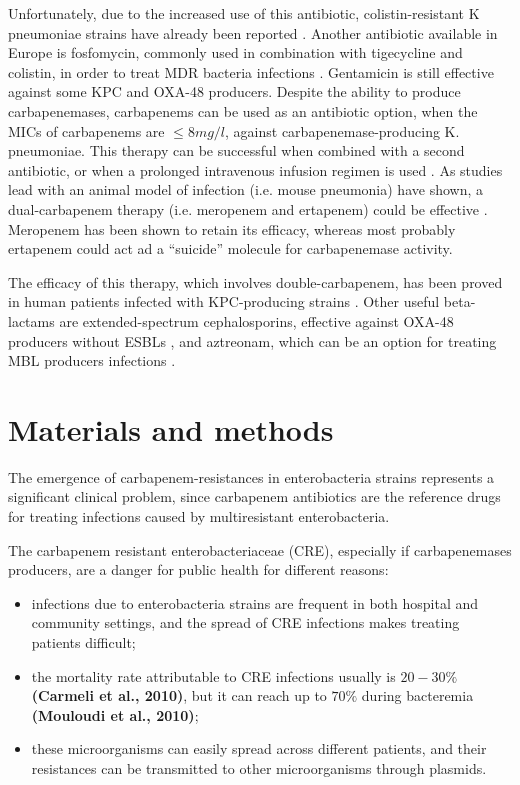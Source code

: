 \documentclass[11pt]{report}
\begin{document}
Unfortunately, due to the increased use of this antibiotic, 
colistin-resistant K pneumoniae strains have already been reported \cite{mammina2012ongoing}.
Another antibiotic available in Europe is fosfomycin, commonly used in combination with tigecycline and colistin, in order to treat MDR bacteria infections \cite{pontikis2014outcomes}.
Gentamicin is still effective against some KPC and OXA-48
producers.
Despite the ability to produce carbapenemases, carbapenems can be used as an antibiotic option, when the MICs of carbapenems are $\le 8mg/l$, against carbapenemase-producing K. pneumoniae.
This therapy can be successful when combined with a second antibiotic, or when a prolonged intravenous infusion regimen is used \cite{tzouvelekis2014treating, daikos2014carbapenemase, tumbarello2012predictors}.
As studies lead with an animal model of infection (i.e. mouse pneumonia) have shown, a dual-carbapenem therapy (i.e. meropenem and ertapenem) could be effective \cite{wiskirchen2014vivo}.
Meropenem has been shown to retain its efficacy, whereas most probably ertapenem could act ad a ``suicide'' molecule for carbapenemase activity.

The efficacy of this therapy, which involves double-carbapenem, has been proved in human patients infected with KPC-producing strains \cite{giamarellou2013effectiveness}.
Other useful beta-lactams are extended-spectrum cephalosporins, effective against OXA-48 producers without ESBLs \cite{mimoz2012broad}, and aztreonam, which can be an option for treating MBL producers infections \cite{nordmann2011emerging}.

\chapter{Materials and methods}

The emergence of carbapenem-resistances in enterobacteria strains represents a significant clinical problem, since carbapenem antibiotics are the reference drugs for treating infections caused by multiresistant enterobacteria.

The carbapenem resistant enterobacteriaceae (CRE), especially if carbapenemases producers, are a danger for public health for different reasons:
\begin{itemize}
\item infections due to enterobacteria strains are frequent in both hospital and community settings, and the spread of CRE infections makes treating patients difficult;
\item the mortality rate attributable to CRE infections usually is $20-30\%$ \textbf{(Carmeli et al., 2010)}, but it can reach up to $70\%$ during bacteremia \textbf{(Mouloudi et al., 2010)};
\item these microorganisms can easily spread across different patients, and their resistances can be transmitted to other microorganisms through plasmids.
\end{itemize}
\end{document}
